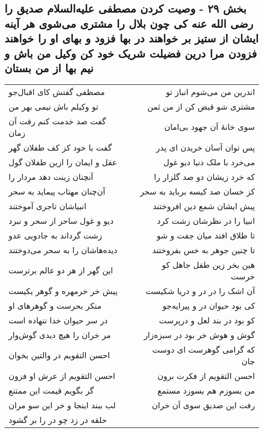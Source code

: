 \begin{center}
\section*{بخش ۲۹ - وصیت کردن مصطفی علیه‌السلام صدیق را رضی الله عنه کی چون بلال را مشتری می‌شوی هر آینه ایشان از ستیز بر خواهند در بها فزود و بهای او را خواهند فزودن مرا درین فضیلت شریک خود کن وکیل من باش و نیم بها از من بستان}
\label{sec:sh029}
\begin{longtable}{l p{0.5cm} r}
مصطفی گفتش کای اقبال‌جو
&&
اندرین من می‌شوم انباز تو
\\
تو وکیلم باش نیمی بهر من
&&
مشتری شو قبض کن از من ثمن
\\
گفت صد خدمت کنم رفت آن زمان
&&
سوی خانهٔ آن جهود بی‌امان
\\
گفت با خود کز کف طفلان گهر
&&
پس توان آسان خریدن ای پدر
\\
عقل و ایمان را ازین طفلان گول
&&
می‌خرد با ملک دنیا دیو غول
\\
آنچنان زینت دهد مردار را
&&
که خرد زیشان دو صد گلزار را
\\
آن‌چنان مهتاب پیماید به سحر
&&
کز خسان صد کیسه برباید به سحر
\\
انبیاشان تاجری آموختند
&&
پیش ایشان شمع دین افروختند
\\
دیو و غول ساحر از سحر و نبرد
&&
انبیا را در نظرشان زشت کرد
\\
زشت گرداند به جادویی عدو
&&
تا طلاق افتد میان جفت و شو
\\
دیده‌هاشان را به سحر می‌دوختند
&&
تا چنین جوهر به خس بفروختند
\\
این گهر از هر دو عالم برترست
&&
هین بخر زین طفل جاهل کو خرست
\\
پیش خر خرمهره و گوهر یکیست
&&
آن اشک را در در و دریا شکیست
\\
منکر بحرست و گوهرهای او
&&
کی بود حیوان در و پیرایه‌جو
\\
در سر حیوان خدا ننهاده است
&&
کو بود در بند لعل و درپرست
\\
مر خران را هیچ دیدی گوش‌وار
&&
گوش و هوش خر بود در سبزه‌زار
\\
احسن التقویم در والتین بخوان
&&
که گرامی گوهرست ای دوست جان
\\
احسن التقویم از عرش او فزون
&&
احسن التقویم از فکرت برون
\\
گر بگویم قیمت این ممتنع
&&
من بسوزم هم بسوزد مستمع
\\
لب ببند اینجا و خر این سو مران
&&
رفت این صدیق سوی آن خران
\\
حلقه در زد چو در را بر گشود

\end{longtable}
\end{center}
